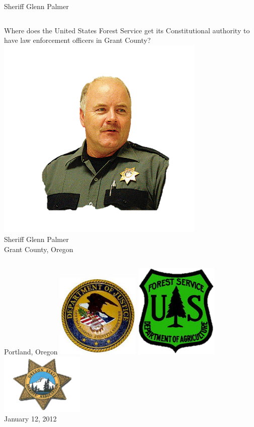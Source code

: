 \documentclass{beamer}
\begin{document}
\begin{frame}{Sheriff Glenn Palmer}
    \begin{columns}[onlytextwidth]
            \centering
            Where does the United States Forest Service get its Constitutional authority to have law enforcement officers in Grant County?
            \centering
            \includegraphics[width=0.75\textwidth]{img/glenn-palmer.png}
            \\ Sheriff Glenn Palmer
            \\ Grant County, Oregon
    \end{columns}
\end{frame}

\begin{frame}{Portland, Oregon}
    \includegraphics[width=0.3\textwidth]{img/doj.png}
    \includegraphics[width=0.3\textwidth]{img/usfs.png}
    \includegraphics[width=0.3\textwidth]{img/ossa.png}
    {   
        \centering
        \\ January 12, 2012 \\
    }
\end{frame}
\end{document}
